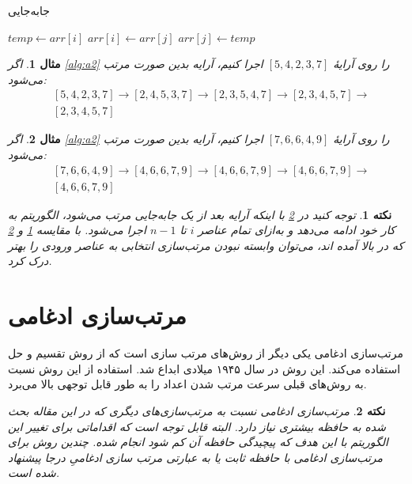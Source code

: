 \documentclass[12pt]{article}
\newtheorem{remark}{نکته}
\newtheorem{example}{مثال}
\begin{document}
\begin{algorithm}[H]
  \caption{جابه‌جایی}
  \label{alg:a3}
  \begin{latin}
    \begin{algorithmic}[1]
      \State $temp \gets arr[i]$
      \State $arr[i] \gets arr[j]$
      \State $arr[j] \gets temp$
      \EndProcedure
    \end{algorithmic}
  \end{latin}
\end{algorithm}

\begin{example}
  \label{ex:e2}
  اگر
  \cref{alg:a2}
  را روی آرایهٔ
  $[5, 4, 2, 3, 7]$
  اجرا کنیم،
  آرایه بدین صورت مرتب می‌شود:
  \begin{align*}
     & [5, 4, 2, 3, 7] \rightarrow [2, 4, 5, 3, 7] \rightarrow
    [2, 3, 5, 4, 7] \rightarrow [2, 3, 4, 5, 7] \rightarrow    \\
     & [2, 3, 4, 5, 7]
  \end{align*}
\end{example}

\begin{example}
  \label{ex:e3}
  اگر
  \cref{alg:a2}
  را روی آرایهٔ
  $[7, 6, 6, 4, 9]$
  اجرا کنیم،
  آرایه بدین صورت مرتب می‌شود:
  \begin{align*}
     & [7, 6, 6, 4, 9] \rightarrow [4, 6, 6, 7, 9] \rightarrow
    [4, 6, 6, 7, 9] \rightarrow [4, 6, 6, 7, 9] \rightarrow    \\
     & [4, 6, 6, 7, 9]
  \end{align*}
\end{example}

\begin{remark}
  توجه کنید در
  \cref{ex:e3}
  با اینکه آرایه بعد از یک جابه‌جایی مرتب می‌شود،
  الگوریتم به کار خود ادامه می‌دهد و به‌ازای تمام عناصر
  $i$
  تا
  $n-1$
  اجرا می‌شود.
  با مقایسه
  \cref{ex:e2}
  و
  \cref{ex:e3}
  که در بالا آمده اند،
  می‌توان وابسته نبودن مرتب‌سازی انتخابی به عناصر ورودی را بهتر درک کرد.
\end{remark}


\section{مرتب‌سازی ادغامی\protect{}}
مرتب‌سازی ادغامی یکی دیگر از روش‌های مرتب سازی است که از روش تقسیم و حل
استفاده می‌کند.
این روش در سال ۱۹۴۵ میلادی ابداع شد.
\cite{art}
استفاده از این روش نسبت به روش‌های قبلی سرعت مرتب شدن اعداد را به طور قابل توجهی بالا می‌برد.

\begin{remark}
  مرتب‌سازی ادغامی نسبت به مرتب‌سازی‌های دیگری که در این مقاله بحث شده
  به حافظه بیشتری نیاز دارد. البته قابل توجه است که اقداماتی برای تغییر این الگوریتم
  با این هدف که پیچیدگی حافظه آن کم شود انجام شده.
  چندین روش برای مرتب‌سازی ادغامی با حافظه ثابت
  یا به عبارتی مرتب سازی ادغامیِ درجا
  پیشنهاد شده است.
  \cite{merge1}
\end{remark}

{
\fontsize{12pt}{10pt}\selectfont


}
\end{document}
